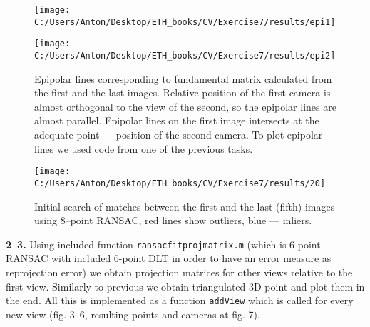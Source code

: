 \documentclass{report}
\begin{document}
	\begin{figure}[h]
		\begin{center}
			\begin{minipage}[h]{0.45\linewidth}
				\texttt{[image: C:/Users/Anton/Desktop/ETH\_books/CV/Exercise7/results/epi1]}
			\end{minipage}
			\hfill
			\begin{minipage}[h]{0.45\linewidth}
			\texttt{[image: C:/Users/Anton/Desktop/ETH\_books/CV/Exercise7/results/epi2]}
		\end{minipage}
		\caption{Epipolar lines corresponding to fundamental matrix calculated from the first and the last images. Relative position of the first camera is almost orthogonal to the view of the second, so the epipolar lines are almost parallel. Epipolar lines on the first image intersects at the adequate point --- position of the second camera. To plot epipolar lines we used code from one of the previous tasks.}
	\end{center}
\end{figure}
	\begin{figure}[h]
		\begin{center}
			\begin{minipage}[h]{0.9\linewidth}
				\texttt{[image: C:/Users/Anton/Desktop/ETH\_books/CV/Exercise7/results/20]}
				\caption{Initial search of matches between the first and the last (fifth) images using 8--point RANSAC, red lines show outliers, blue --- inliers.}
			\end{minipage}
	\end{center}
\end{figure}
\newpage
\textbf{2--3.} Using included function \texttt{ransacfitprojmatrix.m} (which is 6-point RANSAC with included 6-point DLT in order to have an error measure as reprojection error) we obtain projection matrices for other views relative to the first view. Similarly to previous we obtain triangulated 3D-point and plot them in the end. All this is implemented as a function \texttt{addView} which is called for every new view (fig. 3--6, resulting points and cameras at fig. 7).
\end{document}
